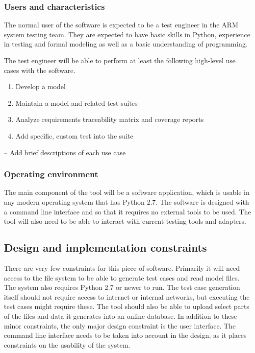 \subsubsection{Users and characteristics}
The normal user of the software is expected to be a test engineer in the ARM system testing team. They are expected to have basic skills in Python, experience in testing and formal modeling as well as a basic understanding of programming. 

The test engineer will be able to perform at least the following high-level use cases with the software. 

\begin{enumerate}
	\item Develop a model
	\item Maintain a model and related test suites
	\item Analyze requirements traceability matrix and coverage reports
	\item Add specific, custom test into the suite
\end{enumerate}  

-- Add brief descriptions of each use case

\subsubsection{Operating environment}
The main component of the tool will be a software application, which is usable in any modern operating system that has Python 2.7. The software is designed with a command line interface and so that it requires no external tools to be used. The tool will also need to be able to interact with current testing tools and adapters. 

\subsection{Design and implementation constraints}
There are very few constraints for this piece of software. Primarily it will need access to the file system to be able to generate test cases and read model files. The system also requires Python 2.7 or newer to run. The test case generation itself should not require access to internet or internal networks, but executing the test cases might require these. The tool should also be able to upload select parts of the files and data it generates into an online database. In addition to these minor constraints, the only major design constraint is the user interface. The command line interface needs to be taken into account in the design, as it places constraints on the usability of the system.

